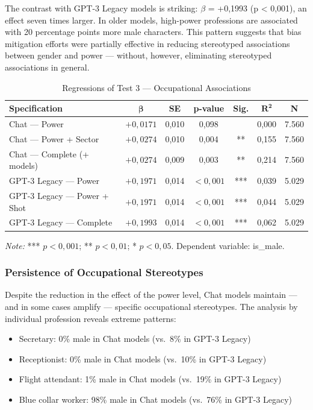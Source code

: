 \documentclass[12pt,a4paper]{article}
\begin{document}
The contrast with GPT-3 Legacy models is striking: $\beta$ = +0,1993 (p <
0,001), an effect seven times larger. In older models, high-power professions are associated with 20 percentage points more male
characters. This pattern suggests that bias mitigation efforts
were partially effective in reducing stereotyped associations between
gender and power --- without, however, eliminating stereotyped associations in
general.

\begin{table}[H]
\centering
\caption{Regressions of Test 3 --- Occupational Associations}
\label{tab:reg-teste3}
\begin{tabular}{lcccccc}
\toprule
\textbf{Specification} & $\boldsymbol{\beta}$ & \textbf{SE} & \textbf{p-value} & \textbf{Sig.} & $\boldsymbol{R^2}$ & \textbf{N} \\
\midrule
Chat --- Power & $+0,0171$ & 0,010 & 0,098 & & 0,000 & 7.560 \\
Chat --- Power + Sector & $+0,0274$ & 0,010 & 0,004 & ** & 0,155 & 7.560 \\
Chat --- Complete (+ models) & $+0,0274$ & 0,009 & 0,003 & ** & 0,214 & 7.560 \\
GPT-3 Legacy --- Power & $+0,1971$ & 0,014 & $<0,001$ & *** & 0,039 & 5.029 \\
GPT-3 Legacy --- Power + Shot & $+0,1971$ & 0,014 & $<0,001$ & *** & 0,044 & 5.029 \\
GPT-3 Legacy --- Complete & $+0,1993$ & 0,014 & $<0,001$ & *** & 0,062 & 5.029 \\
\bottomrule
\end{tabular}

\smallskip
\footnotesize\textit{Note:} *** $p < 0,001$; ** $p < 0,01$; * $p < 0,05$. Dependent variable: is\_male.
\end{table}
\subsubsection{Persistence of Occupational Stereotypes}


Despite the reduction in the effect of the power level, Chat models maintain
--- and in some cases amplify --- specific occupational stereotypes.
The analysis by individual profession reveals extreme patterns:

\begin{itemize}
\item Secretary: 0\% male in Chat models (vs.\ 8\% in GPT-3 Legacy)
\item Receptionist: 0\% male in Chat models (vs.\ 10\% in GPT-3 Legacy)
\item Flight attendant: 1\% male in Chat models (vs.\ 19\% in GPT-3 Legacy)
\item Blue collar worker: 98\% male in Chat models (vs.\ 76\% in GPT-3 Legacy)
\end{itemize}
\end{document}
